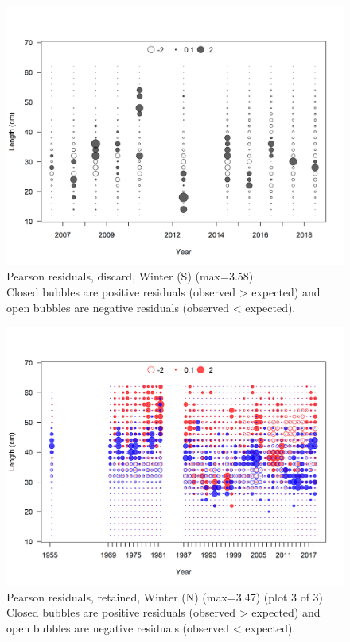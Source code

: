 \documentclass[12pt,]{article}
\begin{document}
\begin{figure}
\centering
\includegraphics{r4ss/plots_mod1/comp_lenfit_residsflt3mkt1.png}
\caption{Pearson residuals, discard, Winter (S) (max=3.58)\\
Closed bubbles are positive residuals (observed \textgreater{} expected)
and open bubbles are negative residuals (observed \textless{} expected).
\label{fig:discard_ss_len_pearson}}
\end{figure}

\begin{figure}
\centering
\includegraphics{r4ss/plots_mod1/comp_lenfit_residsflt1mkt2_page3.png}
\caption{Pearson residuals, retained, Winter (N) (max=3.47) (plot 3 of
3)\\
Closed bubbles are positive residuals (observed \textgreater{} expected)
and open bubbles are negative residuals (observed \textless{} expected).
\label{fig:wn_len_pearson}}
\end{figure}
\end{document}
